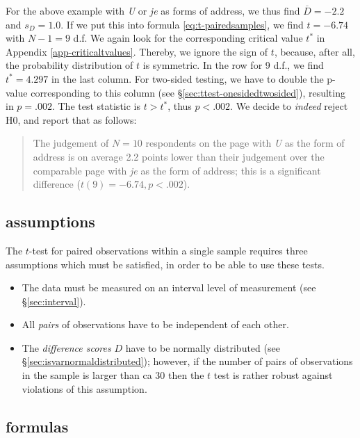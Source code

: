 \documentclass[
]{book}
\begin{document}
For the above example with \emph{U} or \emph{je} as forms of address,
we thus find \(\overline{D}=-2.2\) and \(s_D=1.0\). If we put this into
formula \eqref{eq:t-pairedsamples}, we find \(t=-6.74\) with \(N-1=9\) d.f.
We again look for the corresponding critical value \(t^*\)
in Appendix \ref{app-criticaltvalues}. Thereby, we ignore the sign of \(t\),
because, after all, the probability distribution of \(t\) is symmetric.
In the row for 9 d.f., we find \(t^*=4.297\) in the last column.
For two-sided testing, we have to double the p-value corresponding to this
column (see
§\ref{sec:ttest-onesidedtwosided}), resulting in \(p=.002\).
The test statistic is \(t > t^*\), thus \(p<.002\). We decide to
\emph{indeed} reject H0, and report that as follows:

\begin{quote}
The judgement of \(N=10\) respondents on the page with \emph{U} as the
form of address is on average 2.2 points lower than their judgement
over the comparable page with \emph{je} as the form of address; this is
a significant difference (\(t(9)=-6.74, p<.002\)).
\end{quote}

\hypertarget{assumptions-1}{%
\subsection{assumptions}\label{assumptions-1}}

The \(t\)-test for paired observations within a single sample requires three
assumptions which must be satisfied, in order to be able to use these
tests.

\begin{itemize}
\item
  The data must be measured on an interval level of measurement (see
  §\ref{sec:interval}).
\item
  All \emph{pairs} of observations have to be independent of
  each other.
\item
  The \emph{difference scores} \(D\) have to be normally distributed (see §\ref{sec:isvarnormaldistributed}); however, if the number of pairs of
  observations in the sample is larger than ca 30 then the \(t\) test is rather robust against violations of this assumption.
\end{itemize}

\hypertarget{sec:formulas13-4}{%
\subsection{formulas}\label{sec:formulas13-4}}
\end{document}
